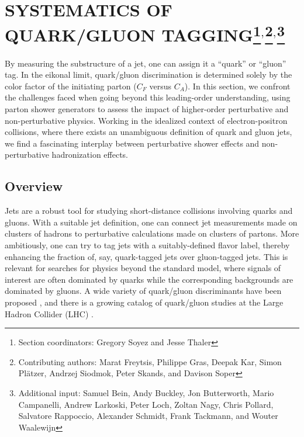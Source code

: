 \documentclass[11pt]{cernrep}
\begin{document}
\section{SYSTEMATICS OF QUARK/GLUON TAGGING\protect\footnote{Section coordinators: Gregory Soyez and Jesse Thaler}$^{,}$\protect\footnote{Contributing authors: Marat Freytsis, Philippe Gras, Deepak Kar, Simon Pl\"atzer, Andrzej Siodmok, Peter Skands, and Davison Soper}$^{,}$\protect\footnote{Additional input: Samuel Bein, Andy Buckley, Jon Butterworth, Mario Campanelli, Andrew Larkoski, Peter Loch, Zoltan Nagy, Chris Pollard, Salvatore Rappoccio, Alexander Schmidt, Frank Tackmann, and Wouter Waalewijn}}

By measuring the substructure of a jet, one can assign it a ``quark'' or ``gluon'' tag.  In the eikonal limit, quark/gluon discrimination is determined solely by the color factor of the initiating parton ($C_F$ versus $C_A$).  In this section, we confront the challenges faced when going beyond this leading-order understanding, using parton shower generators to assess the impact of higher-order perturbative and non-perturbative physics.  Working in the idealized context of electron-positron collisions, where there exists an unambiguous definition of quark and gluon jets, we find a fascinating interplay between perturbative shower effects and non-perturbative hadronization effects.

\subsection{Overview}
\label{quarkgluon_sec:overview}

Jets are a robust tool for studying short-distance collisions involving quarks and gluons.  With a suitable jet definition, one can connect jet measurements made on clusters of hadrons to perturbative calculations made on clusters of partons.  More ambitiously, one can try to tag jets with a suitably-defined flavor label, thereby enhancing the fraction of, say, quark-tagged jets over gluon-tagged jets.  This is relevant for searches for physics beyond the standard model, where signals of interest are often dominated by quarks while the corresponding backgrounds are dominated by gluons.  A wide variety of quark/gluon discriminants have been proposed \cite{Gallicchio:2011xq,Gallicchio:2012ez,Krohn:2012fg,Pandolfi:1480598,Chatrchyan:2012sn,Larkoski:2013eya,Larkoski:2014pca}, and there is a growing catalog of quark/gluon studies at the Large Hadron Collider (LHC) \cite{Aad:2014gea,Aad:2014bia,Khachatryan:2014dea,Aad:2015owa,Khachatryan:2015bnx,Aad:2016oit}.
\end{document}
